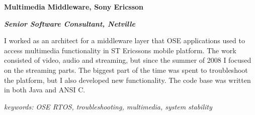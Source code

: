 \item[2008-2009] \textbf{Multimedia Middleware, Sony Ericsson}

\textit{\textbf{Senior Software Consultant, Netville}}

I worked as an architect for a middleware layer that OSE applications used to access multimedia functionality in ST Ericssons mobile platform. The work consisted of video, audio and streaming, but since the summer of 2008 I focused on the streaming parts. The biggest part of the time was spent to troubleshoot the platform, but I also developed new functionality. The code base was written in both Java and ANSI C.

\textit{keywords: OSE RTOS, troubleshooting, multimedia, system stability}